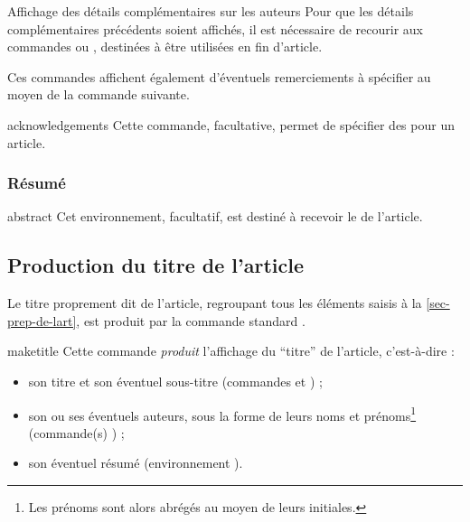 \begin{dbremark}{Affichage des détails complémentaires sur les auteurs}{}
  Pour que les détails complémentaires précédents soient affichés, il est
  nécessaire de recourir aux commandes  ou
  , destinées à être utilisées en fin d'article.

  Ces commandes affichent également d'éventuels remerciements à spécifier au
  moyen de la commande  suivante.
\end{dbremark}

\begin{docCommand}{acknowledgements}{}
  Cette commande, facultative, permet de spécifier des  pour
  un article.
\end{docCommand}

\begin{bodycode}
\end{bodycode}

\subsubsection{Résumé}
\label{sec-resume}

\begin{docEnvironment}[doclang/environment content=résumé]{abstract}{}
  Cet environnement, facultatif, est destiné à recevoir le  de
  l'article.
\end{docEnvironment}

\subsection{Production du titre de l'article}
\label{sec-creation-du-titre}

Le titre proprement dit de l'article, regroupant tous les éléments saisis à la
\vref{sec-prep-de-lart}, est produit par la commande standard
.

\begin{docCommand}[doc description=\mandatory]{maketitle}{}
  Cette commande \emph{produit} l'affichage du \enquote{titre} de l'article,
  c'est-à-dire :
  \begin{itemize}
  \item son titre et son éventuel sous-titre (commandes  et
    ) ;
  \item son ou ses éventuels auteurs, sous la forme de leurs noms et
    prénoms\footnote{Les prénoms sont alors abrégés au moyen de leurs
      initiales.} (commande(s) ) ;
  \item son éventuel résumé (environnement ).
  \end{itemize}
\end{docCommand}

